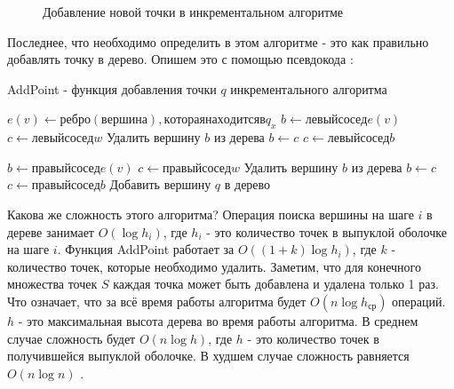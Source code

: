 \begin{figure}[H]
	{\centering
		\hfill
		\hfill
		\hfill
		\hfill
		\hfill
	}
	\caption{Добавление новой точки в инкрементальном алгоритме}
	\label{img:incremental_newpoint}
\end{figure}


Последнее, что необходимо определить в этом алгоритме - это как правильно добавлять точку в дерево. Опишем это с помощью псевдокода \cite{incremental2005presentation} \cite{instructor2004incremental}:

\begin{algorithm}[H]
	\caption{AddPoint - функция добавления точки $q$ инкрементального алгоритма}
	\label{alg:incremental_addpoint}
	\begin{algorithmic}[1]
		\State $e (v) \gets ребро (вершина), которая находится в q_x$
		\State $b \gets левый сосед e(v)$
		\State $c \gets левый сосед w$
			\State Удалить вершину $b$ из дерева
			\State $b \gets c$
			\State $c \gets левый сосед b$
		\EndWhile
		
		\State $b \gets правый сосед e(v)$
		\State $c \gets правый сосед w$
			\State Удалить вершину $b$ из дерева
			\State $b \gets c$
			\State $c \gets правый сосед b$
		\EndWhile
		\State Добавить вершину $q$ в дерево
		\EndProcedure
	\end{algorithmic}
\end{algorithm}

Какова же сложность этого алгоритма? Операция поиска вершины на шаге $i$ в дереве занимает $O(\log h_i)$, где $h_i$ - это количество точек в выпуклой оболочке на шаге $i$. Функция AddPoint работает за $O((1+k) \log h_i)$, где $k$ - количество точек, которые необходимо удалить. Заметим, что для конечного множества точек $S$ каждая точка может быть добавлена и удалена только 1 раз. Что означает, что за всё время работы алгоритма будет $O(n \log h_{ср})$ операций. $h$ - это максимальная высота дерева во время работы алгоритма. В среднем случае сложность будет $O(n \log h)$, где $h$ - это количество точек в получившейся выпуклой оболочке. В худшем случае сложность равняется $O(n \log n)$ \cite{instructor2004incremental}.

